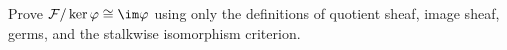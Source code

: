 \begin{problem}
Prove $\mathcal F/\ker\varphi\cong\im\varphi$ using only the definitions of quotient sheaf, image sheaf, germs, and the stalkwise isomorphism criterion.
\end{problem}
